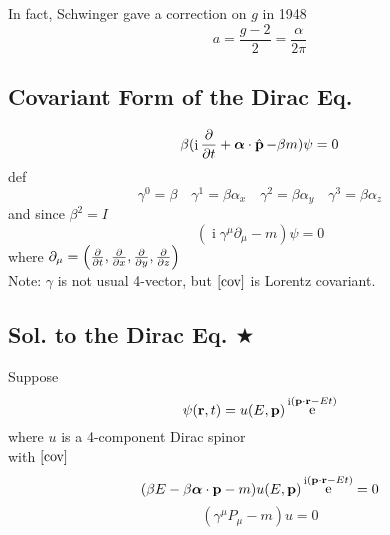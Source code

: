 \documentclass[a4paper]{article}
\DeclareMathOperator{\e}{\mathrm{e}}
\DeclareMathOperator{\I}{\mathrm{i}}
\DeclareMathOperator{\hp}{\hat{\vb{p}}}
\numberwithin{equation}{section}
\begin{document}
In fact, Schwinger gave a correction on $ g $ in 1948
\begin{equation}\label{key}
a = \dfrac{g - 2}{2} = \dfrac{\alpha}{2\pi}
\end{equation}


\subsection{Covariant Form of the Dirac Eq.}
\begin{equation}\label{key}
\beta(\I\pdv{t} + \bm\alpha\cdot\hp - \beta m)\psi = 0
\end{equation}
def
\begin{equation}\label{key}
\gamma^0 = \beta \quad \gamma^1 = \beta\alpha_x \quad \gamma^2 = \beta\alpha_y \quad \gamma^3 = \beta\alpha_z
\end{equation}
and since $ \beta^2 = I $
\begin{equation}\label{cov}
(\I\gamma^\mu \partial_\mu - m)\psi = 0
\end{equation}
where $ \partial_\mu = \qty(\pdv{t}, \pdv{x}, \pdv{y}, \pdv{z}) $\\
Note: $ \gamma $ is not usual 4-vector, but $ \eqref{cov} $ is Lorentz covariant.

\subsubsection{}

\subsection{Sol. to the Dirac Eq. $ \bigstar $}
Suppose
\begin{equation}\label{key}
\psi(\vb{r}, t) = u(E, \vb{p})\e^{\I(\vb{p}\cdot\vb{r} - Et)}
\end{equation}
where $ u $ is a 4-component Dirac spinor\\
with $ \eqref{cov} $
\begin{equation}\label{key}
(\beta E - \beta\bm\alpha\cdot\vb{p} - m) u(E, \vb{p})\e^{\I(\vb{p}\cdot\vb{r} - Et)} = 0
\end{equation}
\begin{equation}\label{key}
(\gamma^\mu P_\mu - m)u = 0
\end{equation}
\end{document}
